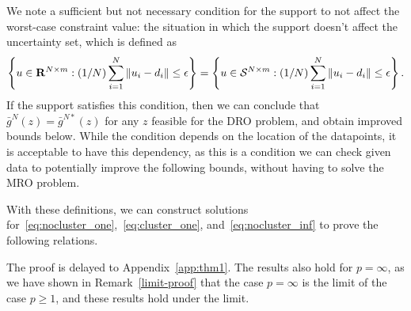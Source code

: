 {{We note a sufficient but not necessary condition for the support to not affect the worst-case constraint value: the situation in which the support doesn't affect the uncertainty set, which is defined as 
$$\left \{u \in {\mathbf R}^{N\times m}: (1/N)\sum_{i=1}^N  \| u_i - d_i \| \le \epsilon\right \} = \left \{ u \in \mathcal{S}^{N\times m}: (1/N)\sum_{i=1}^N \| u_i - d_i \| \le \epsilon\right \}.$$
If the support satisfies this condition, then we can conclude that $\bar{g}^N(z) = \bar{g}^{N*}(z)$ for any $z$ feasible for the \gls{DRO} problem, and obtain improved bounds below. 
While the condition depends on the location of the datapoints, it is acceptable to have this dependency, as this is a condition we can check given data to potentially improve the following bounds, without having to solve the MRO problem.}

With these definitions, we can construct solutions for~\eqref{eq:nocluster_one},~\eqref{eq:cluster_one}, and~\eqref{eq:nocluster_inf} to prove the following relations.
\begin{theorem}
	\label{thm:1}
\end{theorem}
The proof is delayed to Appendix~\ref{app:thm1}. The results also hold for $p = \infty$, as we have shown in Remark~\ref{limit-proof} that the case $p = \infty$ is the limit of the case $p \geq 1$, and these results hold under the limit.

}
